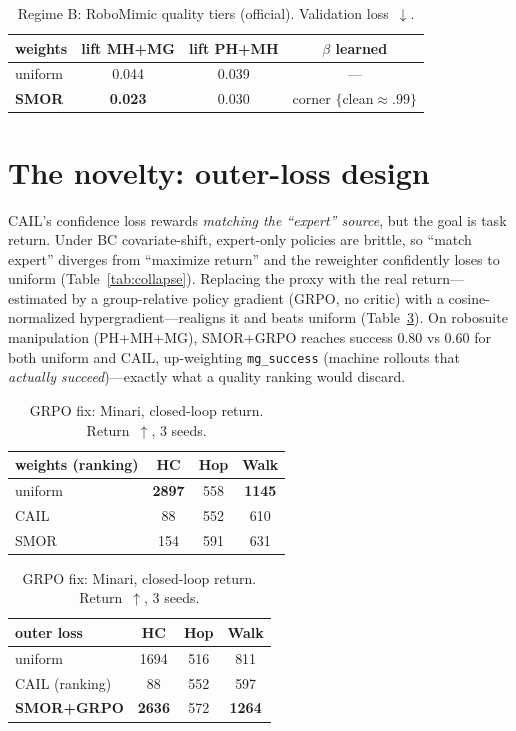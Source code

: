 \documentclass[11pt]{article}
\newcommand{\win}[1]{\textbf{#1}}
\newcommand{\loss}[1]{#1}
\begin{document}
\begin{table}[h]\centering\small
\caption{Regime B: RoboMimic quality tiers (official). Validation loss~$\downarrow$.}
\label{tab:B}
\begin{tabular}{lccc}
\toprule
weights & lift MH+MG & lift PH+MH & $\beta$ learned\\
\midrule
uniform & 0.044 & 0.039 & ---\\
\textbf{SMOR} & \textbf{0.023} & 0.030 & corner $\{$clean$\approx.99\}$\\
\bottomrule
\end{tabular}
\end{table}

\section{The novelty: outer-loss design}
CAIL's confidence loss rewards \emph{matching the ``expert'' source}, but the goal is task
return. Under BC covariate-shift, expert-only policies are brittle, so ``match expert'' diverges
from ``maximize return'' and the reweighter confidently loses to uniform (Table~\ref{tab:collapse}).
Replacing the proxy with the real return---estimated by a group-relative policy gradient
(GRPO, no critic) with a cosine-normalized hypergradient---realigns it and beats
uniform (Table~\ref{tab:grpo}). On robosuite manipulation (PH+MH+MG), SMOR+GRPO reaches success
$0.80$ vs $0.60$ for both uniform and CAIL, up-weighting \texttt{mg\_success} (machine
rollouts that \emph{actually succeed})---exactly what a quality ranking would discard.

\begin{table}[h]\centering\small
\begin{minipage}{0.49\textwidth}\centering
\caption{Misalignment: Minari (official), ranking outer loss. Return~$\uparrow$, 3 seeds.}
\label{tab:collapse}
\begin{tabular}{lccc}
\toprule
weights (ranking) & HC & Hop & Walk\\
\midrule
uniform & \win{2897} & 558 & \win{1145}\\
CAIL    & \loss{88}  & 552 & 610\\
SMOR    & \loss{154} & 591 & 631\\
\bottomrule
\end{tabular}
\end{minipage}\hfill
\begin{minipage}{0.49\textwidth}\centering
\caption{GRPO fix: Minari, closed-loop return. Return~$\uparrow$, 3 seeds.}
\label{tab:grpo}
\begin{tabular}{lccc}
\toprule
outer loss & HC & Hop & Walk\\
\midrule
uniform        & 1694 & 516 & 811\\
CAIL (ranking) & \loss{88} & 552 & 597\\
\textbf{SMOR+GRPO} & \win{2636} & 572 & \win{1264}\\
\bottomrule
\end{tabular}
\end{minipage}
\end{table}
\end{document}
